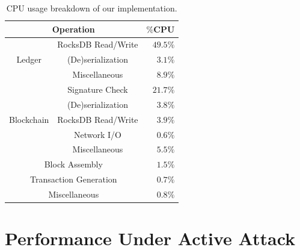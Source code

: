 \begin{table}[ht]
\centering
\caption{CPU usage breakdown of our \prism implementation.}
\begin{tabular}{| c | c || r |} 
 \hline
 \multicolumn{2}{|c||}{Operation} & $\%$CPU \\ [0.5ex] 
 \hline\hline
 \multirow{3}{*}{Ledger} & RocksDB Read/Write & $49.5\%$ \\ %
                         & (De)serialization & $3.1\%$\\ %
                         & Miscellaneous & $8.9\%$\\ \hline
 \multirow{5}{*}{Blockchain}    & Signature Check & $21.7\%$ \\ %
                         & (De)serialization & $3.8\%$ \\
                         & RocksDB Read/Write & $3.9\%$ \\
                         & Network I/O & $0.6\%$ \\ %
                         & Miscellaneous & $5.5\%$\\ \hline
  \multicolumn{2}{|c||}{Block Assembly} & $1.5\%$ \\ \hline
 \multicolumn{2}{|c||}{Transaction Generation} & $0.7\%$ \\ \hline
 \multicolumn{2}{|c||}{Miscellaneous} & $0.8\%$ \\ \hline
\end{tabular}
\label{table:profiling}
\end{table}

\section{Performance Under Active Attack}
\label{sec:eval-attack}

